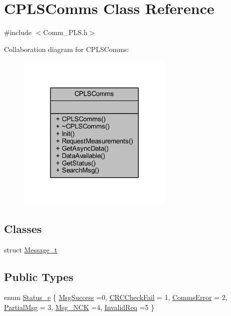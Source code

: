 \hypertarget{class_c_p_l_s_comms}{}\section{C\+P\+L\+S\+Comms Class Reference}
\label{class_c_p_l_s_comms}


{\ttfamily \#include $<$Comm\+\_\+\+P\+L\+S.\+h$>$}



Collaboration diagram for C\+P\+L\+S\+Comms\+:\nopagebreak
\begin{figure}[H]
\begin{center}
\leavevmode
\includegraphics[width=212pt]{class_c_p_l_s_comms__coll__graph}
\end{center}
\end{figure}
\subsection*{Classes}
\begin{DoxyCompactItemize}
\item 
struct \mbox{\hyperlink{struct_c_p_l_s_comms_1_1_message__t}{Message\+\_\+t}}
\end{DoxyCompactItemize}
\subsection*{Public Types}
\begin{DoxyCompactItemize}
\item 
enum \mbox{\hyperlink{class_c_p_l_s_comms_a765bc36363f75f4faf4fd2b41d440159}{Status\+\_\+e}} \{ \newline
\mbox{\hyperlink{class_c_p_l_s_comms_a765bc36363f75f4faf4fd2b41d440159ae570dcdfbc45793ba4555a0affd13537}{Msg\+Success}} =0, 
\mbox{\hyperlink{class_c_p_l_s_comms_a765bc36363f75f4faf4fd2b41d440159a864f2f53e22e459265224c734bb9dd68}{C\+R\+C\+Check\+Fail}} = 1, 
\mbox{\hyperlink{class_c_p_l_s_comms_a765bc36363f75f4faf4fd2b41d440159a25bac8413bc8ba52e18e0f1fd1f95ce3}{Comms\+Error}} = 2, 
\mbox{\hyperlink{class_c_p_l_s_comms_a765bc36363f75f4faf4fd2b41d440159a0b65dd788672e08b0ef59cbf76955d81}{Partial\+Msg}} = 3, 
\newline
\mbox{\hyperlink{class_c_p_l_s_comms_a765bc36363f75f4faf4fd2b41d440159a97259eab94ba1eeb5d236afd0bb9c01b}{Msg\+\_\+\+N\+CK}} =4, 
\mbox{\hyperlink{class_c_p_l_s_comms_a765bc36363f75f4faf4fd2b41d440159ada559acd2007e11466d7e8e461f9bd10}{Invalid\+Req}} =5
 \}
\end{DoxyCompactItemize}
